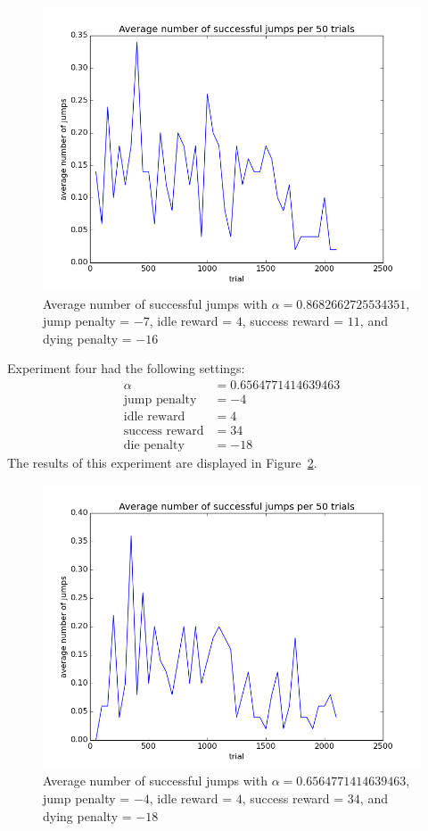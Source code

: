 \documentclass{scrartcl}
\begin{document}
    \begin{figure}[H]
        \includegraphics[width=\textwidth]{../avgJumps3}
        \caption{Average number of successful jumps with $\alpha =
        0.8682662725534351$, jump penalty = $-7$, idle reward = $4$, success
        reward = $11$, and dying penalty = $-16$}
        \label{fig:exp3}
    \end{figure}

    Experiment four had the following settings:
    \begin{align*}
        \alpha &= 0.6564771414639463\\
        \text{jump penalty} &= -4\\
        \text{idle reward} &= 4\\
        \text{success reward} &= 34\\
        \text{die penalty} & = -18
    \end{align*}
    The results of this experiment are displayed in Figure~\ref{fig:exp4}.

    \begin{figure}[H]
        \includegraphics[width=\textwidth]{../avgJumps4}
        \caption{Average number of successful jumps with $\alpha =
        0.6564771414639463$, jump penalty = $-4$, idle reward = $4$, success
        reward = $34$, and dying penalty = $-18$}
        \label{fig:exp4}
    \end{figure}
\end{document}
